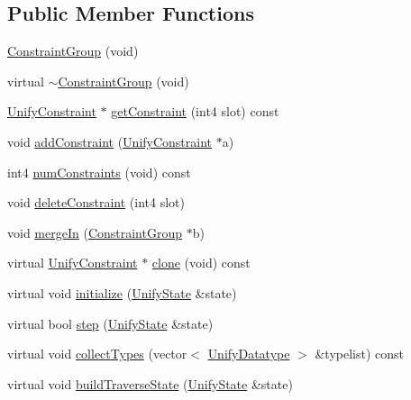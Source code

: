 \subsection*{Public Member Functions}
\begin{DoxyCompactItemize}
\item 
\mbox{\hyperlink{class_constraint_group_a8220351caa63e9d91d7b9cf1efdb7767}{Constraint\+Group}} (void)
\item 
virtual \mbox{\hyperlink{class_constraint_group_a84f832819756b3d2d4f771f5daf35aa2}{$\sim$\+Constraint\+Group}} (void)
\item 
\mbox{\hyperlink{class_unify_constraint}{Unify\+Constraint}} $\ast$ \mbox{\hyperlink{class_constraint_group_ac29f72431489687d61ae3d7fa93e82f6}{get\+Constraint}} (int4 slot) const
\item 
void \mbox{\hyperlink{class_constraint_group_ac9d8bca453351a7318fd3ed48b123032}{add\+Constraint}} (\mbox{\hyperlink{class_unify_constraint}{Unify\+Constraint}} $\ast$a)
\item 
int4 \mbox{\hyperlink{class_constraint_group_a54444c67c89e955b1f6b9d1c8ab2da1f}{num\+Constraints}} (void) const
\item 
void \mbox{\hyperlink{class_constraint_group_a01c6e43bddd0906eae93f915db6375d4}{delete\+Constraint}} (int4 slot)
\item 
void \mbox{\hyperlink{class_constraint_group_aa0d8ef99e07e7a207381515ed9d87ac3}{merge\+In}} (\mbox{\hyperlink{class_constraint_group}{Constraint\+Group}} $\ast$b)
\item 
virtual \mbox{\hyperlink{class_unify_constraint}{Unify\+Constraint}} $\ast$ \mbox{\hyperlink{class_constraint_group_a7121c0ef41bb59e28305e5ddb3c80f35}{clone}} (void) const
\item 
virtual void \mbox{\hyperlink{class_constraint_group_a96670ed925bd7fa0146f091baf31e3b2}{initialize}} (\mbox{\hyperlink{class_unify_state}{Unify\+State}} \&state)
\item 
virtual bool \mbox{\hyperlink{class_constraint_group_aeb75604b690052150d7a94392677dd20}{step}} (\mbox{\hyperlink{class_unify_state}{Unify\+State}} \&state)
\item 
virtual void \mbox{\hyperlink{class_constraint_group_ac1b507b8c2e1f0f458fdaa474fc58bc1}{collect\+Types}} (vector$<$ \mbox{\hyperlink{class_unify_datatype}{Unify\+Datatype}} $>$ \&typelist) const
\item 
virtual void \mbox{\hyperlink{class_constraint_group_a2dd52e0b06da735d9ce96f053dfb6bf2}{build\+Traverse\+State}} (\mbox{\hyperlink{class_unify_state}{Unify\+State}} \&state)

\end{DoxyCompactItemize}
